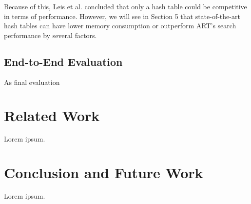 \documentclass[acmtog, nonacm]{acmart}
\begin{document}
Because of this, Leis et al. concluded that only a hash table could be competitive in terms
of performance. However, we will see in Section 5 that state-of-the-art hash tables can have lower memory consumption
or outperform ART's search performance by several factors.

\subsection{End-to-End Evaluation}
As final evaluation

\section{Related Work}

Lorem ipsum.

\section{Conclusion and Future Work}

Lorem ipsum.



\end{document}
